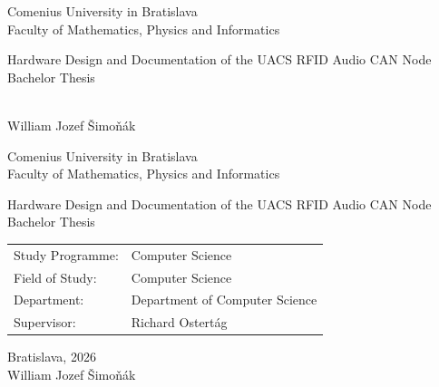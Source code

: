 \documentclass[12pt, oneside]{book}  %
\let\cleardoublepage\clearpage
\def\mfrok{2026}
\def\mfnazov{Hardware Design and Documentation of the UACS RFID Audio CAN Node}
\def\mftyp{Bachelor Thesis}
\def\mfautor{William Jozef Šimoňák}
\def\mfskolitel{Richard Ostertág}
\def\mfmiesto{Bratislava, \mfrok}
\def\mfodbor{Computer Science}
\def\program{Computer Science}
\def\mfpracovisko{Department of Computer Science}
\begin{document}
\frontmatter
\pagestyle{empty}


\begin{center}
  \sc\large
  Comenius University in Bratislava\\
  Faculty of Mathematics, Physics and Informatics

\vfill

{\LARGE\mfnazov}\\
\mftyp
\end{center}

\vfill

{\sc\large
\noindent \mfrok\\
\mfautor
}

\cleardoublepage


\noindent

\begin{center}
\sc
\large
  Comenius University in Bratislava\\
  Faculty of Mathematics, Physics and Informatics

\vfill

{\LARGE\mfnazov}\\
\mftyp
\end{center}

\vfill

\noindent
\begin{tabular}{ll}
Study Programme: & \program \\
Field of Study:  & \mfodbor \\
Department:      & \mfpracovisko \\
Supervisor:      & \mfskolitel \\
\end{tabular}

\vfill

\noindent \mfmiesto\\
\mfautor

\cleardoublepage


\newpage
\setcounter{page}{3}
\hypersetup{pageanchor=false}


\hypersetup{pageanchor=true}


\newpage
\pagestyle{plain}
\end{document}
